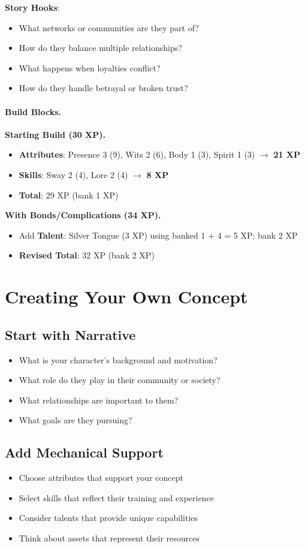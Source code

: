 \textbf{Story Hooks}:
\begin{itemize}
\item What networks or communities are they part of?
\item How do they balance multiple relationships?
\item What happens when loyalties conflict?
\item How do they handle betrayal or broken trust?
\end{itemize}

\paragraph{Build Blocks.}
\textbf{Starting Build (30 XP).}
\begin{itemize}
\item \textbf{Attributes}: Presence 3 (9), Wits 2 (6), Body 1 (3), Spirit 1 (3) $\rightarrow$ \textbf{21 XP}
\item \textbf{Skills}: Sway 2 (4), Lore 2 (4) $\rightarrow$ \textbf{8 XP}
\item \textbf{Total}: 29 XP (bank 1 XP)
\end{itemize}
\textbf{With Bonds/Complications (34 XP).}
\begin{itemize}
\item Add \textbf{Talent}: Silver Tongue (3 XP) using banked 1 + 4 = 5 XP; bank 2 XP
\item \textbf{Revised Total}: 32 XP (bank 2 XP)
\end{itemize}

\section{Creating Your Own Concept}

\subsection*{Start with Narrative}
\begin{itemize}
\item What is your character's background and motivation?
\item What role do they play in their community or society?
\item What relationships are important to them?
\item What goals are they pursuing?
\end{itemize}

\subsection*{Add Mechanical Support}
\begin{itemize}
\item Choose attributes that support your concept
\item Select skills that reflect their training and experience
\item Consider talents that provide unique capabilities
\item Think about assets that represent their resources
\end{itemize}

